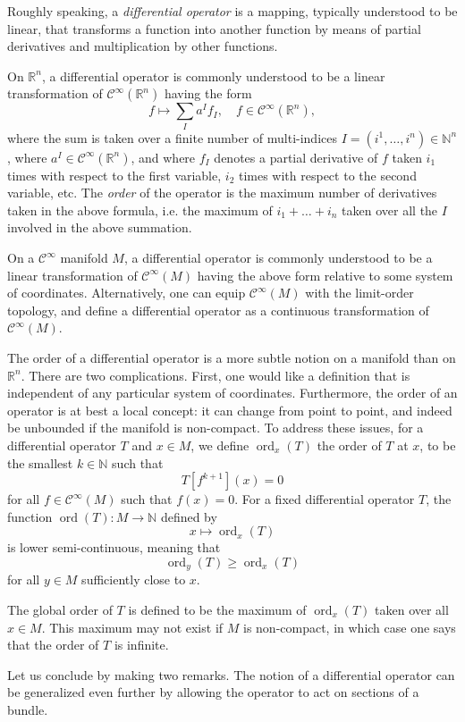 \documentclass{article}
\newcommand{\reals}{\mathbb{R}}
\newcommand{\natnums}{\mathbb{N}}
\newcommand{\cfty}{\mathcal{C}^\infty}
\newcommand{\ord}{\mathop{\mathrm{ord}}\nolimits}
\begin{document}
Roughly speaking, a {\em differential operator} is a mapping,
typically understood to be linear, that transforms a function into
another function by means of partial derivatives and multiplication by
other functions.  

On $\reals^n$, a differential operator is commonly understood to be a
linear transformation of $\cfty(\reals^n)$ having the form
$$  f \mapsto \sum_{I} a^I f_I,\quad f\in
\cfty(\reals^n),  
$$
where the sum is taken over a finite number of multi-indices
$I=(i^1,\ldots,i^n)\in \natnums^n$, where $a^I\in
\cfty(\reals^n)$, and where $f_I$ denotes a partial
derivative of $f$ taken $i_1$ times with respect to the first
variable, $i_2$ times with respect to the second variable, etc.
The {\em order} of the operator is the maximum number of derivatives
taken in the above formula, i.e. the maximum of $i_1+\ldots+i_n$
taken over all the $I$ involved in the above summation.

On a $\cfty$ manifold $M$, a differential operator is commonly
understood to be a linear transformation of $\cfty(M)$ having the
above form relative to some system of coordinates.  Alternatively, one
can equip $\cfty(M)$ with the limit-order topology, and define a
differential operator as a continuous transformation of $\cfty(M)$.

The order of a differential operator is a more subtle notion on a
manifold than on $\reals^n$.  There are two complications. First, one
would like a definition that is independent of any particular system
of coordinates.  Furthermore, the order of an operator is at best a local
concept: it can change from
point to point, and indeed be unbounded if the manifold is
non-compact.  To address these issues, for a differential operator $T$
and $x\in M$, 
we define $\ord_x(T)$ the order of $T$ at $x$, to be the smallest
$k\in\natnums$ such that
$$T[f^{k+1}](x) = 0$$
for all $f\in\cfty(M)$ such that $f(x)=0$.  For
a fixed differential operator $T$, the function $\ord(T):M\rightarrow
\natnums$ defined by
$$x\mapsto \ord_x(T)$$
is lower semi-continuous, meaning that
$$\ord_y(T)\geq \ord_x(T)$$
for all $y\in M$ sufficiently close to $x$.

The global order of $T$ is defined to be the maximum of $\ord_x(T)$
taken over all $x\in M$.  This maximum may not exist if $M$ is
non-compact, in which case one says that the order of $T$ is infinite.

Let us conclude by making two remarks. The notion of a differential
operator can be generalized even further by allowing the operator to
act on sections of a bundle.
\end{document}
